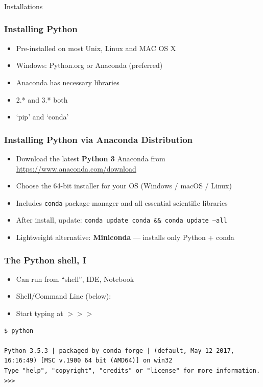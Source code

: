 \begin{frame}[fragile]\frametitle{}
\begin{center}
{\Large Installations}
\end{center}
\end{frame}

\begin{frame}[fragile]\frametitle{Installing Python}
  \begin{itemize}
  \item Pre-installed on most Unix, Linux and MAC OS X
   \item Windows: Python.org or Anaconda (preferred)
   \item Anaconda has necessary libraries
\item 2.* and 3.* both
\item `pip' and `conda'
  \end{itemize}
\end{frame}

\begin{frame}[fragile]\frametitle{Installing Python via Anaconda Distribution}
  \begin{itemize}
  \item Download the latest \textbf{Python 3} Anaconda from \url{https://www.anaconda.com/download}
  \item Choose the 64-bit installer for your OS (Windows / macOS / Linux)
  \item Includes \texttt{conda} package manager and all essential scientific libraries
  \item After install, update: \texttt{conda update conda \&\& conda update --all}
  \item Lightweight alternative: \textbf{Miniconda} --- installs only Python + conda
  \end{itemize}
\end{frame}

\begin{frame}[fragile]  \frametitle{The Python shell, I}
  \begin{itemize}
 \item Can run from ``shell'', IDE, Notebook
 \item Shell/Command Line (below):

\item Start typing at  $>>>$ 
\end{itemize}

\begin{lstlisting}
$ python

Python 3.5.3 | packaged by conda-forge | (default, May 12 2017, 16:16:49) [MSC v.1900 64 bit (AMD64)] on win32
Type "help", "copyright", "credits" or "license" for more information.
>>>
\end{lstlisting}
\end{frame}

